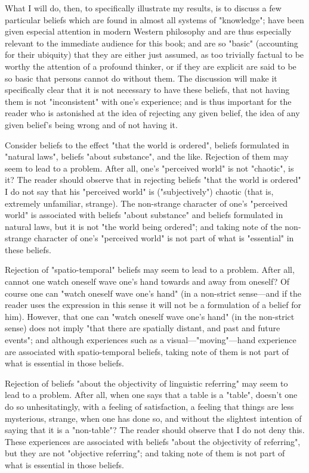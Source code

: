 \documentclass[10pt,twoside,draft]{memoir}
\begin{document}
{What I will do, then, to specifically illustrate my results, is to discuss a 
few particular beliefs which are found in almost all systems of "knowledge"; 
have been given especial attention in modern Western philosophy and are 
thus especially relevant to the immediate audience for this book; and are so 
"basic" (accounting for their ubiquity) that they are either just assumed, as 
too trivially factual to be worthy the attention of a profound thinker, or if 
they are explicit are said to be so basic that persons cannot do without them. 
The discussion will make it specifically clear that it is not necessary to have 
these beliefs, that not having them is not "inconsistent" with one's 
experience; and is thus important for the reader who is astonished at the idea 
of rejecting any given belief, the idea of any given belief's being wrong and 
of not having it. 

Consider beliefs to the effect "that the world is ordered", beliefs 
formulated in "natural laws", beliefs "about substance", and the like. 
Rejection of them may seem to lead to a problem. After all, one's "perceived 
world" is not "chaotic", is it? The reader should observe that in rejecting 
beliefs "that the world is ordered" I do not say that his "perceived world" is 
("subjectively") chaotic (that is, extremely unfamiliar, strange). The 
non-strange character of one's "perceived world" is associated with beliefs 
"about substance" and beliefs formulated in natural laws, but it is not "the 
world being ordered"; and taking note of the non-strange character of one's 
"perceived world" is not part of what is "essential" in these beliefs. 

Rejection of "spatio-temporal" beliefs may seem to lead to a problem. 
After all, cannot one watch oneself wave one's hand towards and away from 
oneself? Of course one can "watch oneself wave one's hand" (in a non-strict 
sense---and if the reader uses the expression in this sense it will not be a 
formulation of a belief for him). However, that one can "watch oneself wave 
one's hand" (in the non-strict sense) does not imply "that there are spatially 
distant, and past and future events"; and although experiences such as a 
visual---"moving"---hand experience are associated with spatio-temporal 
beliefs, taking note of them is not part of what is essential in those beliefs. 

Rejection of beliefs "about the objectivity of linguistic referring" may 
seem to lead to a problem. After all, when one says that a table is a "table", 
doesn't one do so unhesitatingly, with a feeling of satisfaction, a feeling that 
things are less mysterious, strange, when one has done so, and without the 
slightest intention of saying that it is a "non-table"? The reader should 
observe that I do not deny this. These experiences are associated with beliefs 
"about the objectivity of referring", but they are not "objective referring"; 
and taking note of them is not part of what is essential in those beliefs. 

}
\end{document}
